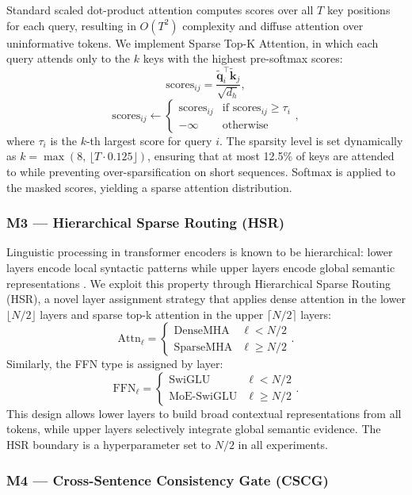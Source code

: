 \documentclass[conference]{IEEEtran}
\begin{document}
Standard scaled dot-product attention computes scores over all $T$ key positions for each query, resulting in $O(T^2)$ complexity and diffuse attention over uninformative tokens. We implement Sparse Top-K Attention, in which each query attends only to the $k$ keys with the highest pre-softmax scores:
\[
\text{scores}_{ij} = \frac{\tilde{\mathbf{q}}_i^\top \tilde{\mathbf{k}}_j}{\sqrt{d_h}},
\]
\[
\text{scores}_{ij} \leftarrow \begin{cases} \text{scores}_{ij} & \text{if } \text{scores}_{ij} \geq \tau_i \\ -\infty & \text{otherwise} \end{cases},
\]
where $\tau_i$ is the $k$-th largest score for query $i$. The sparsity level is set dynamically as $k = \max(8,\, \lfloor T \cdot 0.125 \rfloor)$, ensuring that at most 12.5\% of keys are attended to while preventing over-sparsification on short sequences. Softmax is applied to the masked scores, yielding a sparse attention distribution.

\subsubsection{M3 — Hierarchical Sparse Routing (HSR)}
\label{sec:hsr}

Linguistic processing in transformer encoders is known to be hierarchical: lower layers encode local syntactic patterns while upper layers encode global semantic representations \cite{tenney2019bert}. We exploit this property through Hierarchical Sparse Routing (HSR), a novel layer assignment strategy that applies dense attention in the lower $\lfloor N/2 \rfloor$ layers and sparse top-k attention in the upper $\lceil N/2 \rceil$ layers:
\[
\text{Attn}_\ell = \begin{cases} \text{DenseMHA} & \ell < N/2 \\ \text{SparseMHA} & \ell \geq N/2 \end{cases}.
\]
Similarly, the FFN type is assigned by layer:
\[
\text{FFN}_\ell = \begin{cases} \text{SwiGLU} & \ell < N/2 \\ \text{MoE-SwiGLU} & \ell \geq N/2 \end{cases}.
\]
This design allows lower layers to build broad contextual representations from all tokens, while upper layers selectively integrate global semantic evidence. The HSR boundary is a hyperparameter set to $N/2$ in all experiments.

\subsubsection{M4 — Cross-Sentence Consistency Gate (CSCG)}
\end{document}
